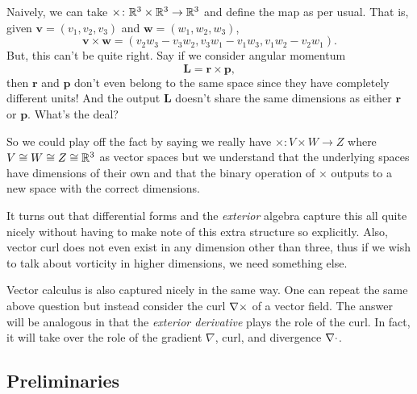 \begin{answer}
Naively, we can take $\times \colon \mathbb{R}^3 \times \mathbb{R}^3 \to \mathbb{R}^3$ and define the map as per usual.  That is, given $\mathbf{v}=(v_1,v_2,v_3)$ and $\mathbf{w}=(w_1,w_2,w_3)$,
\[
\mathbf{v}\times \mathbf{w} = (v_2w_3-v_3w_2,v_3w_1-v_1w_3,v_1w_2-v_2w_1).
\]
But, this can't be quite right.  Say if we consider angular momentum 
\[
\mathbf{L}=\mathbf{r}\times \mathbf{p},
\]
then $\mathbf{r}$ and $\mathbf{p}$ don't even belong to the same space since they have completely different units! And the output $\mathbf{L}$ doesn't share the same dimensions as either $\mathbf{r}$ or $\mathbf{p}$. What's the deal?

So we could play off the fact by saying we really have $\times \colon V \times W \to Z$ where $V\cong W \cong Z \cong \mathbb{R}^3$ as vector spaces but we understand that the underlying spaces have dimensions of their own and that the binary operation of $\times$ outputs to a new space with the correct dimensions. 
\end{answer}

It turns out that differential forms and the \emph{exterior} algebra capture this all quite nicely without having to make note  of this extra structure so explicitly.  Also, vector curl does not even exist in any dimension other than three, thus if we wish to talk about vorticity in higher dimensions, we need something else.

Vector calculus is also captured nicely in the same way. One can repeat the same above question but instead consider the curl $\nabla \times$ of a vector field.  The answer will be analogous in that the \emph{exterior derivative} plays the role of the curl.  In fact, it will take over the role of the gradient $\nabla$, curl, and divergence $\nabla \cdot$.

\subsection{Preliminaries}


